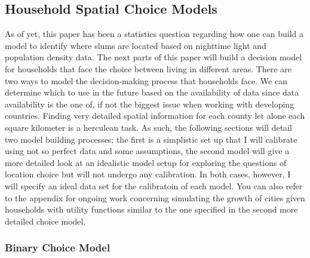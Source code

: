 \subsection{Household Spatial Choice Models}

As of yet, this paper has been a statistics question regarding how one can build a model to identify where slums are located based on nighttime light and population density data. The next parts of this paper will build a decision model for households that face the choice between living in different areas. There are two ways to model the decision-making process that households face. We can determine which to use in the future based on the availability of data since data availability is the one of, if not the biggest issue when working with developing countries. Finding very detailed spatial information for each county let alone each square kilometer is a herculean task. As such, the following sections will detail two model building processes; the first is a simplistic set up that I  will calibrate using not so perfect data and some assumptions, the second model will give a more detailed look at an idealistic model setup for exploring the questions of location choice but will not undergo any calibration. In both cases, however, I will specify an ideal data set for the calibratoin of each model. You can also refer to the appendix for ongoing work concerning simulating the growth of cities given households with utility functions similar to the one specified in the second more detailed choice model.

\subsubsection{Binary Choice Model}

